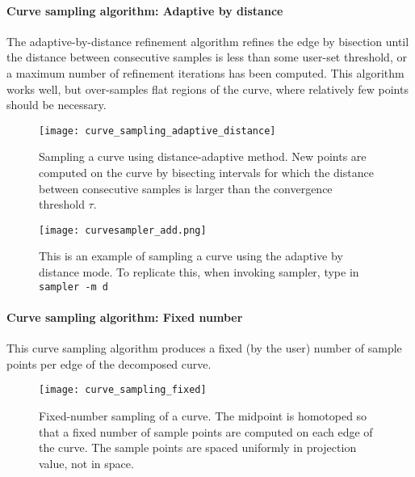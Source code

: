 \paragraph{Curve sampling algorithm: Adaptive by distance}

The adaptive-by-distance refinement algorithm refines the edge by bisection until the distance between consecutive samples is less than some user-set threshold, or a maximum number of refinement iterations has been computed.  This algorithm works well, but over-samples flat regions of the curve, where relatively few points should be necessary.  


\begin{figure}[H]
\begin{center}
\texttt{[image: curve\_sampling\_adaptive\_distance]}
\caption[Adaptive-distance curve sampling]{Sampling a curve using distance-adaptive method.  New points are computed on the curve by bisecting intervals for which the distance between consecutive samples is larger than the convergence threshold $\tau$.}
\end{center}
\end{figure}

\begin{figure}[H]
\centering
\texttt{[image: curvesampler\_add.png]}
\caption{This is an example of sampling a curve using the adaptive by distance mode. To replicate this, when invoking sampler, type in { \tt sampler -m d}}
\end{figure}



\paragraph{Curve sampling algorithm: Fixed number}

This curve sampling algorithm produces a fixed (by the user) number of sample points per edge of the decomposed curve.  


\begin{figure}[H]
\begin{center}
\texttt{[image: curve\_sampling\_fixed]}
\caption[Fixed-number sampling of a curve -- how it works]{Fixed-number sampling of a curve.  The midpoint is homotoped so that a fixed number of sample points are computed on each edge of the curve.  The sample points are spaced uniformly in projection value, not in space.}
\end{center}
\end{figure}

